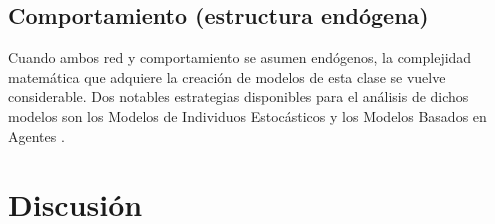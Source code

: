 \documentclass[11pt]{article}
\renewcommand{\Pr}[1]{\mbox{P}\left(#1\right)}
\newcommand{\Prcond}[2]{\Pr{\left.\vphantom{#2}#1\right|#2}}
\newcommand{\trans}[1]{{#1}^\text{\bfseries t}}
\newcommand{\s}[1]{s\left(#1\right)}
\renewcommand{\exp}[1]{\text{exp}\left\{#1\right\}}
\newcommand{\g}{\mathbf{g}}
\newcommand{\G}{\mathbf{G}}
\newcommand{\y}{\mathbf{y}}
\begin{document}
\subsection{Comportamiento (estructura endógena)} Cuando ambos red y comportamiento se asumen endógenos, la complejidad matemática que adquiere la creación de modelos de esta clase se vuelve considerable. Dos notables estrategias disponibles para el análisis de dichos modelos son los Modelos de Individuos Estocásticos \parencite[\textit{Stochastic Actor Oriented Models} o SAOM\footnote{Individuos \textit{estocásticos} porque los sujetos presentes en el sistema toman decisiones de una manera probabilística, \textit{i.e.}, estocástica. Dependiendo de una función objetivo, las personas crean, mantienen, disuelven lazos, o cambian su comportamiento.}, por sus siglas en Inglés,][]{Snijders2010intro} y los Modelos Basados en Agentes \parencite[\textit{Agent-Base Models} o ABM, por sus siglas en Inglés,][entre otros]{Tisue2004}.








%

\section{Discusión}
\end{document}

